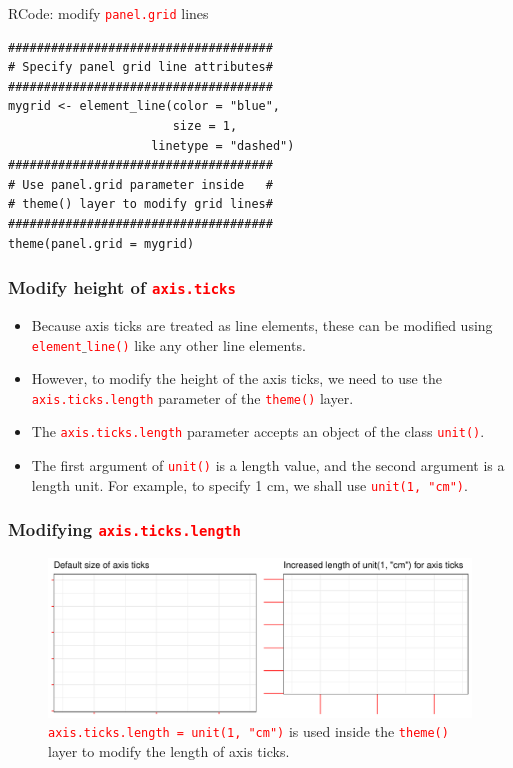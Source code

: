 \documentclass{beamer}
\begin{document}
\begin{frame}[fragile]{RCode: modify \texttt{\textcolor{red}{panel.grid}} lines}
\begin{lstlisting}
#####################################
# Specify panel grid line attributes#
#####################################
mygrid <- element_line(color = "blue",
                       size = 1,
                    linetype = "dashed")
#####################################
# Use panel.grid parameter inside   #
# theme() layer to modify grid lines#
#####################################
theme(panel.grid = mygrid)
\end{lstlisting}
\end{frame}

\begin{frame}\frametitle{Modify height of \texttt{\textcolor{red}{axis.ticks}}}
\begin{itemize}
\item Because axis ticks are treated as line elements, these can be modified using \texttt{\textcolor{red}{element}$\_$\textcolor{red}{line()}} like any other line elements.
\vspace{0.2in}

\item<2-> However, to modify the height of the axis ticks, we need to use the \texttt{\textcolor{red}{axis.ticks.length}} parameter
of the \texttt{\textcolor{red}{theme()}} layer.
\vspace{0.2in}

\item<3-> The \texttt{\textcolor{red}{axis.ticks.length}} parameter accepts an object of the class \texttt{\textcolor{red}{unit()}}.
\vspace{0.2in}

\item<4-> The first argument of  \texttt{\textcolor{red}{unit()}} is a length value, and the second argument is a length unit. For example, to specify 1 cm, we shall use \texttt{\textcolor{red}{unit(1, "cm")}}.
\end{itemize}

\end{frame}

\begin{frame}\frametitle{Modifying \texttt{\textcolor{red}{axis.ticks.length}}}
\begin{figure}
\includegraphics[width=0.99\linewidth]{PlotsLec3/AxisTicksPlt}
\caption{\small{\texttt{\textcolor{red}{axis.ticks.length = unit(1, "cm")}} is used inside the \texttt{\textcolor{red}{theme()}} layer to modify the length of axis ticks}.}
\end{figure}
\end{frame}
\end{document}
